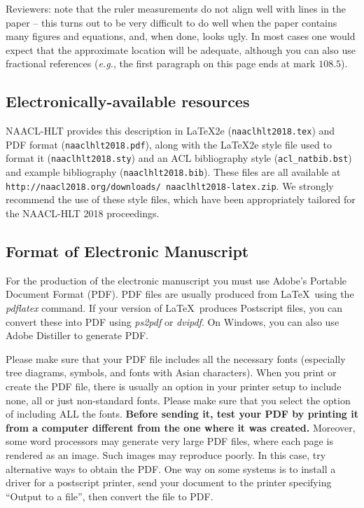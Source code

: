 \documentclass[11pt,a4paper]{article}
\begin{document}
Reviewers: note that the ruler measurements do not align well with
lines in the paper -- this turns out to be very difficult to do well
when the paper contains many figures and equations, and, when done,
looks ugly. In most cases one would expect that the approximate
location will be adequate, although you can also use fractional
references ({\em e.g.}, the first paragraph on this page ends at mark $108.5$).

\subsection{Electronically-available resources}

NAACL-HLT provides this description in \LaTeX2e{} ({\small\tt naaclhlt2018.tex}) and PDF
format ({\small\tt naaclhlt2018.pdf}), along with the \LaTeX2e{} style file used to
format it ({\small\tt naaclhlt2018.sty}) and an ACL bibliography style ({\small\tt acl\_natbib.bst})
and example bibliography ({\small\tt naaclhlt2018.bib}).
These files are all available at
{\small\tt http://naacl2018.org/downloads/ naaclhlt2018-latex.zip}. 
 We
strongly recommend the use of these style files, which have been
appropriately tailored for the NAACL-HLT 2018 proceedings.

\subsection{Format of Electronic Manuscript}
\label{sect:pdf}

For the production of the electronic manuscript you must use Adobe's
Portable Document Format (PDF). PDF files are usually produced from
\LaTeX\ using the \textit{pdflatex} command. If your version of
\LaTeX\ produces Postscript files, you can convert these into PDF
using \textit{ps2pdf} or \textit{dvipdf}. On Windows, you can also use
Adobe Distiller to generate PDF.

Please make sure that your PDF file includes all the necessary fonts
(especially tree diagrams, symbols, and fonts with Asian
characters). When you print or create the PDF file, there is usually
an option in your printer setup to include none, all or just
non-standard fonts.  Please make sure that you select the option of
including ALL the fonts. \textbf{Before sending it, test your PDF by
  printing it from a computer different from the one where it was
  created.} Moreover, some word processors may generate very large PDF
files, where each page is rendered as an image. Such images may
reproduce poorly. In this case, try alternative ways to obtain the
PDF. One way on some systems is to install a driver for a postscript
printer, send your document to the printer specifying ``Output to a
file'', then convert the file to PDF.
\end{document}
